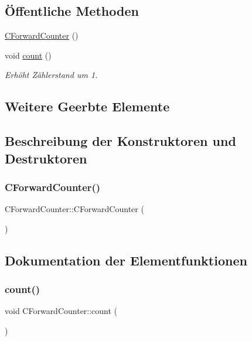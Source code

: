 \subsection*{Öffentliche Methoden}
\begin{DoxyCompactItemize}
\item 
\hyperlink{class_c_forward_counter_aeda1b05d715820f61e377a2c6fa52b2e}{C\+Forward\+Counter} ()
\item 
void \hyperlink{class_c_forward_counter_afc451afa9f8b76f70b28c08982265a86}{count} ()
\begin{DoxyCompactList}\small\item\em Erhöht Zählerstand um 1. \end{DoxyCompactList}\end{DoxyCompactItemize}
\subsection*{Weitere Geerbte Elemente}


\subsection{Beschreibung der Konstruktoren und Destruktoren}
\mbox{\label{class_c_forward_counter_aeda1b05d715820f61e377a2c6fa52b2e}} 
\subsubsection{\texorpdfstring{C\+Forward\+Counter()}{CForwardCounter()}}
{\footnotesize\ttfamily C\+Forward\+Counter\+::\+C\+Forward\+Counter (\begin{DoxyParamCaption}{ }\end{DoxyParamCaption})}



\subsection{Dokumentation der Elementfunktionen}
\mbox{\label{class_c_forward_counter_afc451afa9f8b76f70b28c08982265a86}} 
\subsubsection{\texorpdfstring{count()}{count()}}
{\footnotesize\ttfamily void C\+Forward\+Counter\+::count (\begin{DoxyParamCaption}{ }\end{DoxyParamCaption})\hspace{0.3cm}{\ttfamily [virtual]}}



